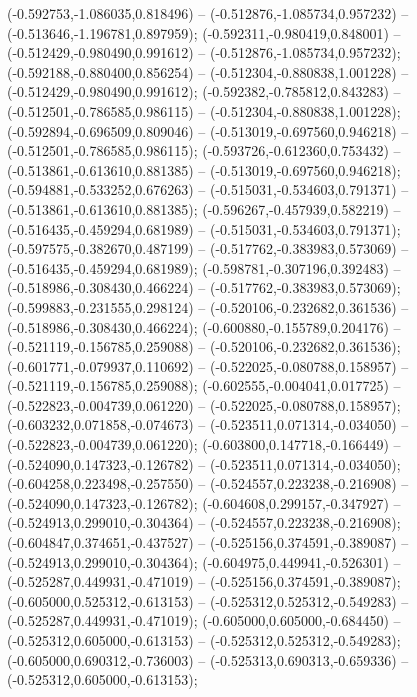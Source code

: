  (-0.592753,-1.086035,0.818496) -- (-0.512876,-1.085734,0.957232) -- (-0.513646,-1.196781,0.897959);
 (-0.592311,-0.980419,0.848001) -- (-0.512429,-0.980490,0.991612) -- (-0.512876,-1.085734,0.957232);
 (-0.592188,-0.880400,0.856254) -- (-0.512304,-0.880838,1.001228) -- (-0.512429,-0.980490,0.991612);
 (-0.592382,-0.785812,0.843283) -- (-0.512501,-0.786585,0.986115) -- (-0.512304,-0.880838,1.001228);
 (-0.592894,-0.696509,0.809046) -- (-0.513019,-0.697560,0.946218) -- (-0.512501,-0.786585,0.986115);
 (-0.593726,-0.612360,0.753432) -- (-0.513861,-0.613610,0.881385) -- (-0.513019,-0.697560,0.946218);
 (-0.594881,-0.533252,0.676263) -- (-0.515031,-0.534603,0.791371) -- (-0.513861,-0.613610,0.881385);
 (-0.596267,-0.457939,0.582219) -- (-0.516435,-0.459294,0.681989) -- (-0.515031,-0.534603,0.791371);
 (-0.597575,-0.382670,0.487199) -- (-0.517762,-0.383983,0.573069) -- (-0.516435,-0.459294,0.681989);
 (-0.598781,-0.307196,0.392483) -- (-0.518986,-0.308430,0.466224) -- (-0.517762,-0.383983,0.573069);
 (-0.599883,-0.231555,0.298124) -- (-0.520106,-0.232682,0.361536) -- (-0.518986,-0.308430,0.466224);
 (-0.600880,-0.155789,0.204176) -- (-0.521119,-0.156785,0.259088) -- (-0.520106,-0.232682,0.361536);
 (-0.601771,-0.079937,0.110692) -- (-0.522025,-0.080788,0.158957) -- (-0.521119,-0.156785,0.259088);
 (-0.602555,-0.004041,0.017725) -- (-0.522823,-0.004739,0.061220) -- (-0.522025,-0.080788,0.158957);
 (-0.603232,0.071858,-0.074673) -- (-0.523511,0.071314,-0.034050) -- (-0.522823,-0.004739,0.061220);
 (-0.603800,0.147718,-0.166449) -- (-0.524090,0.147323,-0.126782) -- (-0.523511,0.071314,-0.034050);
 (-0.604258,0.223498,-0.257550) -- (-0.524557,0.223238,-0.216908) -- (-0.524090,0.147323,-0.126782);
 (-0.604608,0.299157,-0.347927) -- (-0.524913,0.299010,-0.304364) -- (-0.524557,0.223238,-0.216908);
 (-0.604847,0.374651,-0.437527) -- (-0.525156,0.374591,-0.389087) -- (-0.524913,0.299010,-0.304364);
 (-0.604975,0.449941,-0.526301) -- (-0.525287,0.449931,-0.471019) -- (-0.525156,0.374591,-0.389087);
 (-0.605000,0.525312,-0.613153) -- (-0.525312,0.525312,-0.549283) -- (-0.525287,0.449931,-0.471019);
 (-0.605000,0.605000,-0.684450) -- (-0.525312,0.605000,-0.613153) -- (-0.525312,0.525312,-0.549283);
 (-0.605000,0.690312,-0.736003) -- (-0.525313,0.690313,-0.659336) -- (-0.525312,0.605000,-0.613153);
